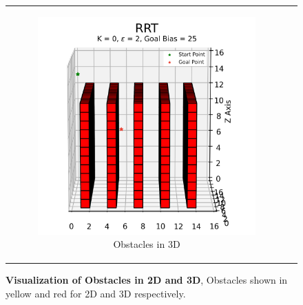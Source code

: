 \begin{figure}[H]
\begin{centering}
\begin{tabular}{cc}
    \begin{subfigure}{0.5\linewidth}
    \includegraphics[width=\linewidth]{chapters/chapter2/img/visualizing/obstacles3d.png}
    \caption{Obstacles in 3D}
    \end{subfigure} \\

\end{tabular}
\caption[Visualization of Obstacles in 2D and 3D]{\textbf{Visualization of Obstacles in 2D and 3D}, Obstacles shown in yellow and red for 2D and 3D respectively.}
\label{fig:rrt_obstacles}
\end{centering}
\end{figure}